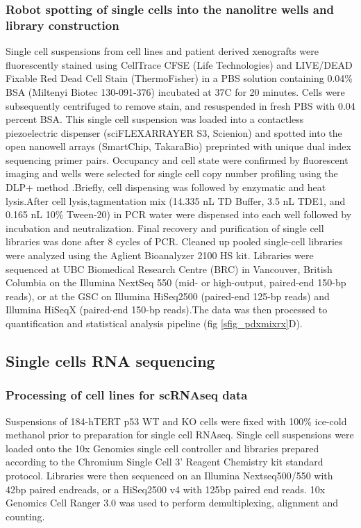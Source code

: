 \documentclass{article}
\begin{document}
\subsubsection{Robot spotting of single cells into the nanolitre wells and library construction}
Single cell suspensions from cell lines and patient derived xenografts were fluorescently stained using CellTrace CFSE (Life Technologies) and LIVE/DEAD Fixable Red Dead Cell Stain (ThermoFisher) in a PBS solution containing 0.04\% BSA (Miltenyi Biotec 130-091-376) incubated at 37C for 20 minutes. Cells were subsequently centrifuged to remove stain, and resuspended in fresh PBS with 0.04 percent BSA. This single cell suspension was loaded into a contactless piezoelectric dispenser (sciFLEXARRAYER S3, Scienion) and spotted into the open nanowell arrays (SmartChip, TakaraBio) preprinted with unique dual index sequencing primer pairs. Occupancy and cell state were confirmed by fluorescent imaging and wells were selected for single cell copy number profiling using the DLP+ method \cite{Laks411058}.Briefly, cell dispensing was followed by enzymatic and heat lysis.After cell lysis,tagmentation mix (14.335 nL TD Buffer, 3.5 nL TDE1, and 0.165 nL 10\% Tween-20) in PCR water were dispensed into each well followed by incubation and neutralization. Final recovery and purification of single cell libraries was done after 8 cycles of PCR. Cleaned up pooled single-cell libraries were analyzed using the Aglient Bioanalyzer 2100 HS kit. Libraries were sequenced at UBC Biomedical Research Centre (BRC) in Vancouver, British Columbia on the Illumina NextSeq 550 (mid- or high-output, paired-end 150-bp reads), or at the GSC on Illumina HiSeq2500 (paired-end 125-bp reads) and Illumina HiSeqX (paired-end 150-bp reads).The data was then processed to quantification and statistical analysis pipeline \cite{Laks411058}(fig \ref{sfig_pdxmixrx}D).

\subsection{Single cells RNA sequencing}

\subsubsection{Processing of cell lines for scRNAseq data }
Suspensions of 184-hTERT p53 WT and KO cells were fixed with 100\% ice-cold methanol prior to preparation for single cell RNAseq. 
Single cell suspensions were loaded onto the 10x Genomics single cell controller and libraries prepared according to the Chromium Single Cell 3’ Reagent Chemistry kit standard protocol. 
Libraries were then sequenced on an Illumina Nextseq500/550 with 42bp paired endreads, or a HiSeq2500 v4 with 125bp paired end reads. 10x Genomics Cell Ranger 3.0 was used to perform demultiplexing, alignment and counting. 
\end{document}
